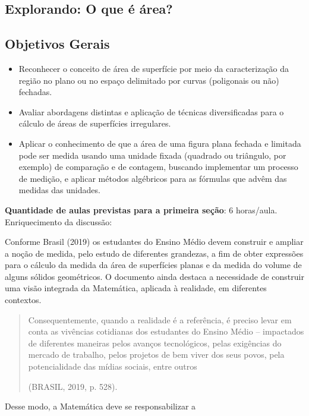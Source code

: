 \begin{paginatexto}
\section{Explorando: O que é área?}

\subsection{Objetivos Gerais}

\begin{itemize}
\item Reconhecer o conceito de área de superfície por meio da caracterização da região no plano ou no espaço delimitado por curvas (poligonais ou não) fechadas.
\item Avaliar abordagens distintas e aplicação de técnicas diversificadas para o cálculo de áreas de superfícies irregulares.
\item Aplicar o conhecimento de que a área de uma figura plana fechada e limitada pode ser medida usando uma unidade fixada (quadrado ou triângulo, por exemplo) de comparação e de contagem, buscando implementar um processo de medição, e aplicar métodos algébricos para as fórmulas que advêm das medidas das unidades.
\end{itemize}

\textbf{Quantidade de aulas previstas para a primeira seção}: 6 horas/aula.
Enriquecimento da discussão:

Conforme Brasil (2019) os estudantes do Ensino Médio devem construir e ampliar a noção de medida, pelo estudo de diferentes grandezas, a fim de obter expressões para o cálculo da medida da área de superfícies planas e da medida do volume de alguns sólidos geométricos. O documento ainda destaca a necessidade de construir uma visão integrada da Matemática, aplicada à realidade, em diferentes contextos.

\begin{quote}
Consequentemente, quando a realidade é a referência, é preciso levar em conta as vivências cotidianas dos estudantes do Ensino Médio – impactados de diferentes maneiras pelos avanços tecnológicos, pelas exigências do mercado de trabalho, pelos projetos de bem viver dos seus povos, pela potencialidade das mídias sociais, entre outros 

\flushright
(BRASIL, 2019, p. 528).
\end{quote}

Desse modo, a Matemática deve se responsabilizar a 


\end{paginatexto}
